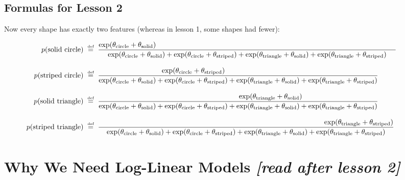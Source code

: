 \documentclass[11pt]{article}
\newcommand{\defeq}{\;\stackrel{\mbox{\tiny def}}{=}\;}
\begin{document}
\subsection{Formulas for Lesson 2}

Now every shape has exactly two features (whereas in lesson 1, some shapes had fewer):

\begin{align*}
\hspace{-12mm}p(\text{solid circle}) & \defeq \frac{\exp (\theta_{\textrm{circle}}+\theta_{\textrm{solid}})\hspace{118mm}}{\exp (\theta_{\textrm{circle}} + \theta_{\textrm{solid}}) + \exp (\theta_{\textrm{circle}} + \theta_{\textrm{striped}}) + \exp (\theta_{\textrm{triangle}} + \theta_{\textrm{solid}}) + \exp (\theta_{\textrm{triangle}} + \theta_{\textrm{striped}})} \\
\rule{0in}{1.5\baselineskip}
\hspace{-12mm}p(\text{striped circle}) & \defeq \frac{\exp (\theta_{\textrm{circle}}+\theta_{\textrm{striped}})\hspace{44mm}}{\exp (\theta_{\textrm{circle}} + \theta_{\textrm{solid}}) + \exp (\theta_{\textrm{circle}} + \theta_{\textrm{striped}}) + \exp (\theta_{\textrm{triangle}} + \theta_{\textrm{solid}}) + \exp (\theta_{\textrm{triangle}} + \theta_{\textrm{striped}})} \\
\rule{0in}{1.5\baselineskip}
\hspace{-12mm}p(\text{solid triangle}) & \defeq \frac{\hspace{32mm}\exp (\theta_{\textrm{triangle}}+\theta_{\textrm{solid}})}{\exp (\theta_{\textrm{circle}} + \theta_{\textrm{solid}}) + \exp (\theta_{\textrm{circle}} + \theta_{\textrm{striped}}) + \exp (\theta_{\textrm{triangle}} + \theta_{\textrm{solid}}) + \exp (\theta_{\textrm{triangle}} + \theta_{\textrm{striped}})} \\
\rule{0in}{1.5\baselineskip}
\hspace{-12mm}p(\text{striped triangle}) & \defeq \frac{\hspace{111mm}\exp (\theta_{\textrm{triangle}}+\theta_{\textrm{striped}})}{\exp (\theta_{\textrm{circle}} + \theta_{\textrm{solid}}) + \exp (\theta_{\textrm{circle}} + \theta_{\textrm{striped}}) + \exp (\theta_{\textrm{triangle}} + \theta_{\textrm{solid}}) + \exp (\theta_{\textrm{triangle}} + \theta_{\textrm{striped}})} 
\end{align*}

\section{Why We Need Log-Linear Models {\em [read after lesson 2]}}
\end{document}
